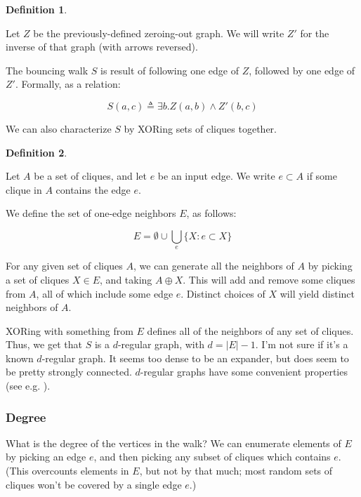 \documentclass[12pt]{article}
\theoremstyle{definition}
\newtheorem{defn}{Definition}[section]
\begin{document}
\begin{defn} \label{def:bouncingWalk}

Let $Z$ be the previously-defined zeroing-out graph. We will write $Z'$ for
the inverse of that graph (with arrows reversed).

The bouncing walk $S$ is result of following one edge of $Z$, followed by one
edge of $Z'$. Formally, as a relation:

\[
S(a,c) \triangleq \exists b. Z(a,b) \land Z'(b,c)
\]

\end{defn}

We can also characterize $S$ by XORing sets of cliques together.

\begin{defn} \label{def:oneEdgeNeighbors}

Let $A$ be a set of cliques, and let $e$ be an input edge. We write
$e \subset A$ if some clique in $A$ contains the edge $e$.

We define the set of one-edge neighbors $E$, as follows:

\[
E = \emptyset \cup \bigcup_e \{ X: e \subset X\}
\]

\end{defn}

For any given set of cliques $A$, we can generate all the neighbors
of $A$ by picking a set of cliques $X \in E$, and taking $A \oplus X$. This will
add and remove some cliques from $A$, all of which include some edge $e$.
Distinct choices of $X$ will yield distinct neighbors of $A$.

XORing with something from $E$ defines all of the neighbors of any set of cliques.
Thus, we get that $S$ is a $d$-regular graph, with $d = |E|-1$.
I'm not sure if it's a known $d$-regular graph.
It seems too
dense to be an expander, but does seem to be pretty strongly connected.
$d$-regular graphs have some convenient properties (see e.g.
\cite{quenell1994spectral}).

\subsubsection{Degree}

What is the degree of the vertices in the walk?
We can enumerate elements of $E$ by picking an edge $e$, 
and then picking any subset of cliques which contains $e$. (This overcounts
elements in $E$, but not by that much; most random sets of cliques won't be
covered by a single edge $e$.)
\end{document}
